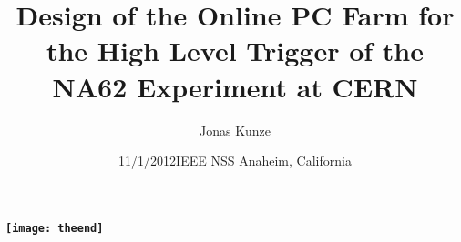 
\usepackage[ngerman]{babel}
\usepackage{bibgerm}

	
\title{Design of the Online PC Farm for the High Level Trigger of the NA62 Experiment at CERN}

\author{Jonas Kunze}
\date{11/1/2012\newline\tiny IEEE NSS Anaheim, California}

\subject{NA62 online pc-farm design and implementation}

 \AtBeginSection[]{%
 \begin{frame}
 \tableofcontents[currentsection]
 \end{frame}
 }%


  	
  	\frame{\tableofcontents}
  	
  	
  	
  	

	\begin{frame}{}
		\begin{center}
			\textbf{\texttt{[image: theend]}}
		\end{center} 
	\end{frame}

